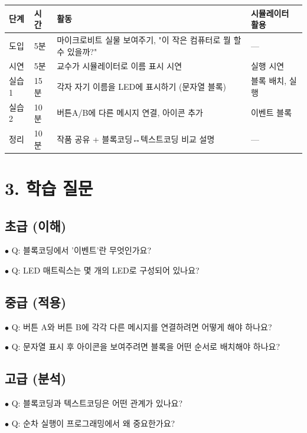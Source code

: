 \documentclass[11pt,a4paper]{article}
\begin{document}
\begin{center}
\renewcommand{\arraystretch}{1.4}
\begin{tabular}{|p{1.5cm}|p{1.5cm}|p{9.4cm}|p{2.6cm}|}
\hline
\rowcolor{tableheader}
\textbf{단계} & \textbf{시간} & \textbf{활동} & \textbf{시뮬레이터 활용} \\
\hline
도입 & 5분 & 마이크로비트 실물 보여주기, "이 작은 컴퓨터로 뭘 할 수 있을까?" & — \\
\hline
시연 & 5분 & 교수가 시뮬레이터로 이름 표시 시연 & 실행 시연 \\
\hline
실습1 & 15분 & 각자 자기 이름을 LED에 표시하기 (문자열 블록) & 블록 배치, 실행 \\
\hline
실습2 & 10분 & 버튼A/B에 다른 메시지 연결, 아이콘 추가 & 이벤트 블록 \\
\hline
정리 & 10분 & 작품 공유 + 블록코딩↔텍스트코딩 비교 설명 & — \\
\hline
\end{tabular}
\end{center}


\section*{3. 학습 질문}

\subsection*{초급 (이해)}

$\bullet$ Q: 블록코딩에서 '이벤트'란 무엇인가요?

$\bullet$ Q: LED 매트릭스는 몇 개의 LED로 구성되어 있나요?


\subsection*{중급 (적용)}

$\bullet$ Q: 버튼 A와 버튼 B에 각각 다른 메시지를 연결하려면 어떻게 해야 하나요?

$\bullet$ Q: 문자열 표시 후 아이콘을 보여주려면 블록을 어떤 순서로 배치해야 하나요?


\subsection*{고급 (분석)}

$\bullet$ Q: 블록코딩과 텍스트코딩은 어떤 관계가 있나요?

$\bullet$ Q: 순차 실행이 프로그래밍에서 왜 중요한가요?
\end{document}
